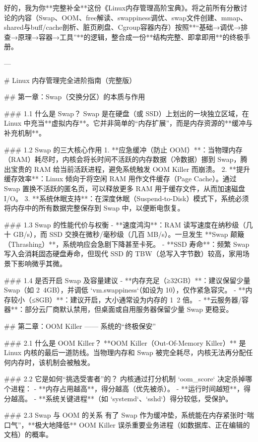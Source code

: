 好的，我为你**完整补全**这份《Linux内存管理高阶宝典》。将之前所有分散讨论的内容（Swap、OOM、free解读、swappiness调优、swap文件创建、mmap、shared与buff/cache剖析、脏页刷盘、Cgroup容器内存）按照**“基础→调优→排查→原理→容器→工具”**的逻辑，整合成一份**结构完整、即拿即用**的终极手册。

---

# Linux 内存管理完全进阶指南（完整版）


## 第一章：Swap（交换分区）的本质与作用

### 1.1 什么是 Swap？
Swap 是在硬盘（或 SSD）上划出的一块独立区域，在 Linux 中充当**虚拟内存**。它并非简单的“内存扩展”，而是内存资源的**缓冲与补充机制**。

### 1.2 Swap 的三大核心作用
1.  **应急缓冲（防止 OOM）**：当物理内存（RAM）耗尽时，内核会将长时间不活跃的内存数据（冷数据）挪到 Swap，腾出宝贵的 RAM 给当前活跃进程，避免系统触发 OOM Killer 而崩溃。
2.  **提升缓存效率**：Linux 倾向于将空闲 RAM 用作文件缓存（Page Cache）。通过 Swap 置换不活跃的匿名页，可以释放更多 RAM 用于缓存文件，从而加速磁盘 I/O。
3.  **系统休眠支持**：在深度休眠（Suspend-to-Disk）模式下，系统必须将内存中的所有数据完整保存到 Swap 中，以便断电恢复。

### 1.3 Swap 的性能代价与权衡
-   **速度鸿沟**：RAM 读写速度在纳秒级（几十 GB/s），而 SSD 交换在微秒/毫秒级（几百 MB/s）。一旦发生 **Swap 颠簸（Thrashing）**，系统响应会急剧下降甚至卡死。
-   **SSD 寿命**：频繁 Swap 写入会消耗固态硬盘寿命，但现代 SSD 的 TBW（总写入字节数）较高，家用场景下影响微乎其微。

### 1.4 是否开启 Swap 及容量建议
-   **内存充足（≥32GB）**：建议保留少量 Swap（如 2~4GB），并调低 `vm.swappiness`（如设为 10），仅作紧急容灾。
-   **内存较小（≤8GB）**：建议开启，大小通常设为内存的 1~2 倍。
-   **云服务器/容器**：部分云厂商默认禁用，但桌面或自用服务器保留少量 Swap 更稳妥。


## 第二章：OOM Killer —— 系统的“终极保安”

### 2.1 什么是 OOM Killer？
**OOM Killer（Out-Of-Memory Killer）** 是 Linux 内核的最后一道防线。当物理内存和 Swap 被完全耗尽，内核无法再分配任何内存时，该机制会被触发。

### 2.2 它是如何“挑选受害者”的？
内核通过打分机制 `oom_score` 决定杀掉哪个进程：
-   **内存占用越高**，得分越高（优先被杀）。
-   **运行时间越短**，得分越高。
-   **系统关键进程**（如 `systemd`、`sshd`）得分较低，受保护。

### 2.3 Swap 与 OOM 的关系
有了 Swap 作为缓冲垫，系统能在内存紧张时“喘口气”，**极大地降低** OOM Killer 误杀重要业务进程（如数据库、正在编辑的文档）的概率。


